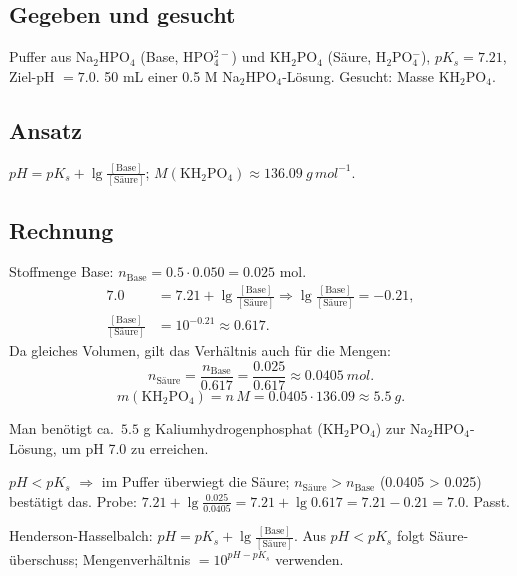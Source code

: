 
\subsection*{Gegeben und gesucht}
Puffer aus Na$_2$HPO$_4$ (Base, HPO$_4^{2-}$) und KH$_2$PO$_4$ (Säure,
H$_2$PO$_4^-$), $pK_s=7.21$, Ziel-pH $=7.0$. 50 mL einer 0.5 M
Na$_2$HPO$_4$-Lösung. Gesucht: Masse KH$_2$PO$_4$.

\subsection*{Ansatz}
$pH=pK_s+\lg\frac{[\text{Base}]}{[\text{Säure}]}$;
$M(\mathrm{KH_2PO_4})\approx136.09\ g\,mol^{-1}$.

\subsection*{Rechnung}
Stoffmenge Base: $n_{\text{Base}}=0.5\cdot0.050=0.025$ mol.
\begin{align*}
  7.0 &= 7.21 + \lg\frac{[\text{Base}]}{[\text{Säure}]}
    \Rightarrow \lg\frac{[\text{Base}]}{[\text{Säure}]} = -0.21,\\
  \frac{[\text{Base}]}{[\text{Säure}]} &= 10^{-0.21} \approx 0.617 .
\end{align*}
Da gleiches Volumen, gilt das Verhältnis auch für die Mengen:
\[
  n_{\text{Säure}} = \frac{n_{\text{Base}}}{0.617}
    = \frac{0.025}{0.617} \approx 0.0405\ mol .
\]
\[
  m(\mathrm{KH_2PO_4}) = n\,M = 0.0405\cdot136.09 \approx 5.5\ g .
\]

\begin{ergebnis}
Man benötigt ca.\ $5.5$ g Kaliumhydrogenphosphat (KH$_2$PO$_4$) zur
Na$_2$HPO$_4$-Lösung, um pH 7.0 zu erreichen.
\end{ergebnis}

\begin{kontrolle}
$pH<pK_s$ $\Rightarrow$ im Puffer überwiegt die Säure; $n_{\text{Säure}}>
n_{\text{Base}}$ (0.0405 > 0.025) bestätigt das. Probe:
$7.21+\lg\frac{0.025}{0.0405} = 7.21+\lg 0.617 =7.21-0.21=7.0$. Passt.
\end{kontrolle}

\begin{merksatz}
Henderson-Hasselbalch: $pH=pK_s+\lg\frac{[\text{Base}]}{[\text{Säure}]}$.
Aus $pH<pK_s$ folgt Säure-überschuss; Mengenverhältnis $=10^{pH-pK_s}$
verwenden.
\end{merksatz}
